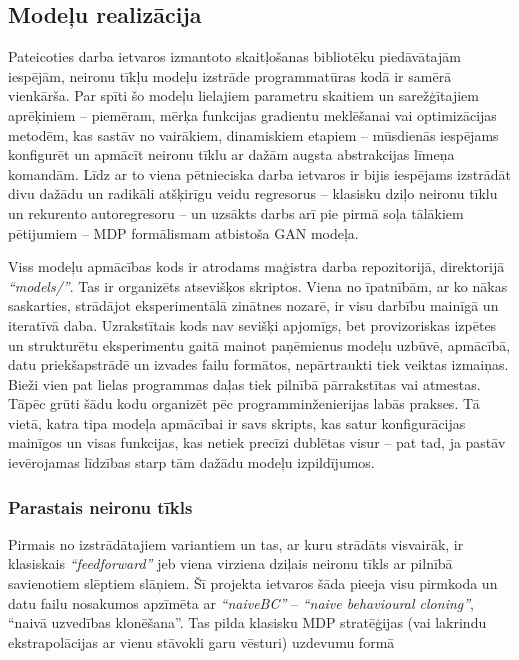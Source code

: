 \documentclass[12pt, a4paper]{article}
\numberwithin{equation}{section} %
\begin{document}
\subsection{Modeļu realizācija}

Pateicoties darba ietvaros izmantoto skaitļošanas bibliotēku piedāvātajām iespējām, neironu tīkļu modeļu izstrāde programmatūras kodā ir samērā vienkārša. Par spīti šo modeļu lielajiem parametru skaitiem un sarežģītajiem aprēķiniem -- piemēram, mērķa funkcijas gradientu meklēšanai vai optimizācijas metodēm, kas sastāv no vairākiem, dinamiskiem etapiem -- mūsdienās iespējams konfigurēt un apmācīt neironu tīklu ar dažām augsta abstrakcijas līmeņa komandām. Līdz ar to viena pētnieciska darba ietvaros ir bijis iespējams izstrādāt divu dažādu un radikāli atšķirīgu veidu regresorus -- klasisku dziļo neironu tīklu un rekurento autoregresoru -- un uzsākts darbs arī pie pirmā soļa tālākiem pētijumiem -- MDP formālismam atbistoša GAN modeļa. 

Viss modeļu apmācības kods ir atrodams maģistra darba repozitorijā, direktorijā \textit{``models/''}. Tas ir organizēts atsevišķos skriptos. Viena no īpatnībām, ar ko nākas saskarties, strādājot eksperimentālā zinātnes nozarē, ir visu darbību mainīgā un iteratīvā daba. Uzrakstītais kods nav sevišķi apjomīgs, bet provizoriskas izpētes un strukturētu eksperimentu gaitā mainot paņēmienus modeļu uzbūvē, apmācībā, datu priekšapstrādē un izvades failu formātos, nepārtraukti tiek veiktas izmaiņas. Bieži vien pat lielas programmas daļas tiek pilnībā pārrakstītas vai atmestas. Tāpēc grūti šādu kodu organizēt pēc programminženierijas labās prakses. Tā vietā, katra tipa modeļa apmācībai ir savs skripts, kas satur konfigurācijas mainīgos un visas funkcijas, kas netiek precīzi dublētas visur -- pat tad, ja pastāv ievērojamas līdzības starp tām dažādu modeļu izpildījumos. 

\subsubsection{Parastais neironu tīkls}

Pirmais no izstrādātajiem variantiem un tas, ar kuru strādāts visvairāk, ir klasiskais \textit{``feedforward''} jeb viena virziena dziļais neironu tīkls ar pilnībā savienotiem slēptiem slāņiem. Šī projekta ietvaros šāda pieeja visu pirmkoda un datu failu nosakumos apzīmēta ar \textit{``naiveBC''} -- \textit{``naive behavioural cloning''}, ``naivā uzvedības klonēšana''. Tas pilda klasisku MDP stratēģijas (vai lakrindu ekstrapolācijas ar vienu stāvokli garu vēsturi) uzdevumu formā
\end{document}
